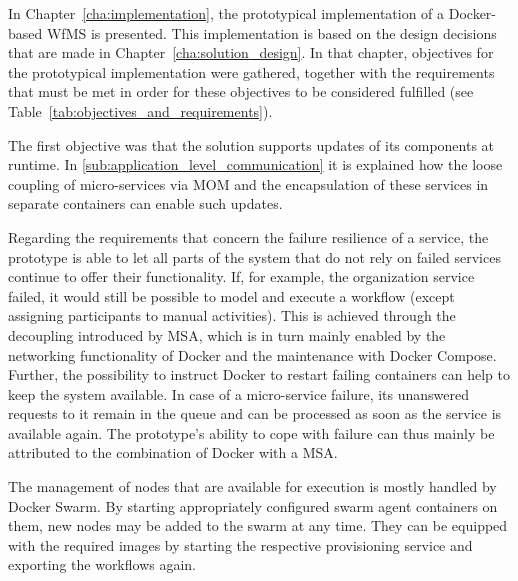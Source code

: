 
  In Chapter~\ref{cha:implementation}, the prototypical implementation of a Docker-based \ac{WfMS} is presented. This implementation is based on the design decisions that are made in Chapter~\ref{cha:solution_design}. In that chapter, objectives for the prototypical implementation were gathered, together with the requirements that must be met in order for these objectives to be considered fulfilled (see Table~\ref{tab:objectives_and_requirements}).


  The first objective was that the solution supports updates of its components at runtime.
  In \ref{sub:application_level_communication} it is explained how the loose coupling of micro-services via \ac{MOM} and the encapsulation of these services in separate containers can enable such updates.

  Regarding the requirements that concern the failure resilience of a service, the prototype is able to let all parts of the system that do not rely on failed services continue to offer their functionality. If, for example, the organization service failed, it would still be possible to model and execute a workflow (except assigning participants to manual activities). This is achieved through the decoupling introduced by \ac{MSA}, which is in turn mainly enabled by the networking functionality of Docker and the maintenance with Docker Compose. Further, the possibility to instruct Docker to restart failing containers can help to keep the system available. In case of a micro-service failure, its unanswered requests to it remain in the queue and can be processed as soon as the service is available again. The prototype's ability to cope with failure can thus mainly be attributed to the combination of Docker with a \ac{MSA}.

  The management of nodes that are available for execution is mostly handled by Docker Swarm. By starting appropriately configured swarm agent containers on them, new nodes may be added to the swarm at any time. They can be equipped with the required images by starting the respective provisioning service and exporting the workflows again.

